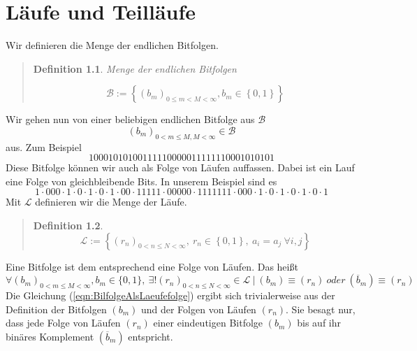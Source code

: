 \documentclass[11pt,oneside,a4paper]{scrreprt}
\newtheorem{defi}{Definition}
\begin{document}
\chapter{Läufe und Teilläufe}\label{ch:LaeufeUndTeillaeufe}
Wir definieren die Menge der endlichen Bitfolgen.
\begin{quote}
	\begin{defi}\label{def:MengeDerBitfolge} Menge der endlichen Bitfolgen
	\begin{center}
		\begin{equation}\label{eqn:MengeDerBitfolge}		
		\mathcal B := \left\{(b_m)_{0\leq m <M<\infty }, b_m\in\left\{0,1\right\}\right\}
		\end{equation}
	\end{center}	
\end{defi}
\end{quote}
\noindent Wir gehen nun von einer beliebigen endlichen Bitfolge aus $\mathcal B $
\begin{equation}\label{eqn:BeliebigeBitfolge}
	(b_m)_{0<m\leq M, M<\infty}\in\mathcal B
\end{equation}
aus. Zum Beispiel
\begin{equation}\label{eqn:RuntestFolge}
	10001010100111110000011111110001010101
\end{equation}
Diese Bitfolge können wir auch als Folge von Läufen auffassen. Dabei ist ein Lauf eine Folge von gleichbleibende Bits.
In unserem Beispiel sind es
\begin{equation}\label{eqn:RuntestFolgeVonLäufe}
	1\cdot 000\cdot 1\cdot 0\cdot 1\cdot 0\cdot 1\cdot 00\cdot 11111\cdot 00000\cdot 1111111\cdot 000\cdot 1\cdot 0\cdot 1\cdot 0\cdot 1\cdot 0\cdot 1
\end{equation}
Mit $\mathcal L$ definieren wir die Menge der Läufe.
\begin{quote}
	\begin{defi}\label{def:MengeDerLäufe}
	\begin{equation}\label{eqn:MengeDerLauefe}
	\mathcal L := \left\lbrace (r_n)_{0<n\le N<\infty},\ r_n\in \left\{0,1\right\},\ a_i=a_j\ \forall i,j \right\rbrace
\end{equation} \label{def:MengeDerLaeufe}
\end{defi}
\end{quote}
\noindent Eine Bitfolge ist dem entsprechend eine Folge von Läufen. Das heißt
\begin{equation}\label{eqn:BilfolgeAlsLaeufefolge}
	\forall (b_m)_{0<m\leq M<\infty}, b_m\in\{0,1\},\ \exists ! (r_n)_{0<n\leq N<\infty}\in\mathcal L\ | \ (b_m)\equiv(r_n)\ oder\ (\overline b_m)\equiv(r_n)
\end{equation}
Die Gleichung (\ref{eqn:BilfolgeAlsLaeufefolge}) ergibt sich trivialerweise aus der Definition der Bitfolgen $(b_m)$ und der Folgen von Läufen $(r_n)$. Sie besagt nur, dass jede Folge von Läufen $(r_n)$ einer eindeutigen Bitfolge $(b_m)$ bis auf ihr binäres Komplement $(\overline b_m)$ entspricht.\\
\end{document}
